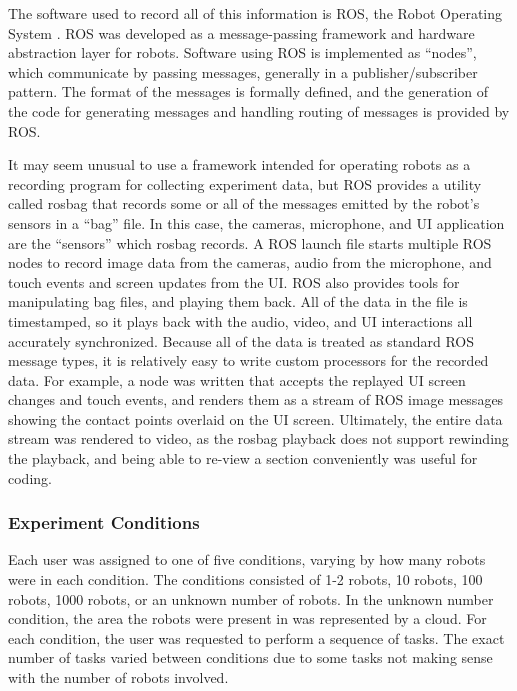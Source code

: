 The software used to record all of this information is ROS, the Robot Operating System \citep{ROS_announcement_paper}. 
ROS was developed as a message-passing framework and hardware abstraction layer for robots. 
Software using ROS is implemented as ``nodes'', which communicate by passing messages, generally in a publisher/subscriber pattern. 
The format of the messages is formally defined, and the generation of the code for generating messages and handling routing of messages is provided by ROS. 

It may seem unusual to use a framework intended for operating robots as a recording program for collecting experiment data, but ROS provides a utility called rosbag that records some or all of the messages emitted by the robot's sensors in a ``bag'' file. 
In this case, the cameras, microphone, and UI application are the ``sensors'' which rosbag records.
A ROS launch file starts multiple ROS nodes to record image data from the cameras, audio from the microphone, and touch events and screen updates from the UI.
ROS also provides tools for manipulating bag files, and playing them back. 
All of the data in the file is timestamped, so it plays back with the audio, video, and UI interactions all accurately synchronized. 
Because all of the data is treated as standard ROS message types, it is relatively easy to write custom processors for the recorded data.
For example, a node was written that accepts the replayed UI screen changes and touch events, and renders them as a stream of ROS image messages showing the contact points overlaid on the UI screen. 
Ultimately, the entire data stream was rendered to video, as the rosbag playback does not support rewinding the playback, and being able to re-view a section conveniently was useful for coding. 

\subsubsection{Experiment Conditions}

Each user was assigned to one of five conditions, varying by how many robots were in each condition. 
The conditions consisted of 1-2 robots, 10 robots, 100 robots, 1000 robots, or an unknown number of robots.
In the unknown number condition, the area the robots were present in was represented by a cloud. 
For each condition, the user was requested to perform a sequence of tasks. 
The exact number of tasks varied between conditions due to some tasks not making sense with the number of robots involved. 

